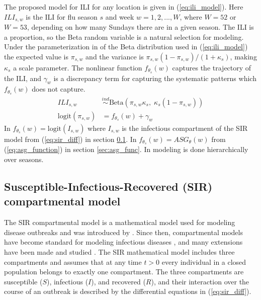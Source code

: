 \documentclass[ba]{imsart}
\theoremstyle{plain}
\theoremstyle{definition}
\theoremstyle{remark}
\begin{document}
The proposed model for ILI for any location is given in (\ref{eq:ili_model}). Here $ILI_{s,w}$ is the ILI for flu season $s$ and week $w = 1, 2, ..., W$, where $W = 52$ or $W = 53$, depending on how many Sundays there are in a given season. The ILI is a proportion, so the Beta random variable is a natural selection for modeling. Under the parameterization in of the Beta distribution used in (\ref{eq:ili_model}) the expected value is $\pi_{s,w}$ and the variance is $\pi_{s,w}(1 - \pi_{s,w})/(1 + \kappa_s)$, making $\kappa_s$ a scale parameter. The nonlinear function $f_{\theta_s}(w)$ captures the trajectory of the ILI, and $\gamma_w$ is a discrepancy term for capturing the systematic patterns which $f_{\theta_s}(w)$ does not capture. 
\begin{equation}
\begin{aligned}
    \label{eq:ili_model}
        ILI_{s,w} &\overset{ind}{\sim} \text{Beta}(\pi_{s,w}\kappa_s,\; \kappa_s(1 - \pi_{s,w})) \\
        \text{logit}(\pi_{s,w}) &= f_{\theta_s}(w) + \gamma_w
\end{aligned}
\end{equation}
In \cite{osthus2019dynamic} $f_{\theta_s}(w) = \text{logit}(I_{s,w})$ where $I_{s,w}$ is the infectious compartment of the SIR model from (\ref{eq:sir_diff}) in section \ref{sec:sir_func}. In \cite{ulloa2019} $f_{\theta_s}(w) = ASG_{\theta}(w)$ from (\ref{eq:asg_function}) in section \ref{sec:asg_func}. In \cite{ulloa2019} modeling is done hierarchically over seasons. 



\subsection{Susceptible-Infectious-Recovered (SIR) compartmental model} \label{sec:sir_func}

The SIR compartmental model is a mathematical model used for modeling disease outbreaks and was introduced by \cite{kermack1927contribution}. Since then, compartmental models have become standard for modeling infectious diseases \cite[]{allen2008mathematical}, and many extensions have been made and studied \cite[for example]{simon2020sir, allen2017primer, van2008deterministic}. The SIR mathematical model includes three compartments and assumes that at any time $t>0$ every individual in a closed population belongs to exactly one compartment. The three compartments are susceptible ($S$), infectious ($I$), and recovered ($R$), and their interaction over the course of an outbreak is described by the differential equations in (\ref{eq:sir_diff}).    
\end{document}
